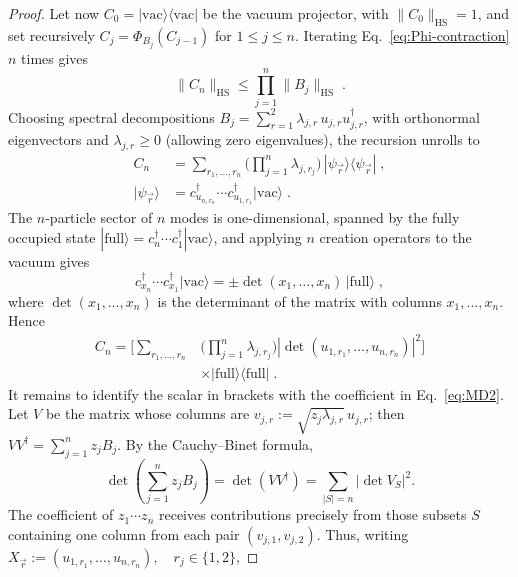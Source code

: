 \documentclass[prx,twocolumn,superscriptaddress,aps,10pt, frontmatterverbose, reprint,footinbib,longbibliography=true]{revtex4-2}
\begin{document}
\begin{proof}
Let now $C_0=|\mathrm{vac}\rangle\langle\mathrm{vac}|$ be the vacuum projector, with $\|C_0\|_{\mathrm{HS}}=1$, and set recursively $C_j=\Phi_{B_j}(C_{j-1})$ for $1\le j\le n$. Iterating Eq.~\eqref{eq:Phi-contraction} $n$ times gives
\begin{equation}
    \|C_n\|_{\mathrm{HS}}\le\prod_{j=1}^n\|B_j\|_{\mathrm{HS}}\;.
    \label{eq:Cn-bound}
\end{equation}
Choosing spectral decompositions $B_j=\sum_{r=1}^2\lambda_{j,r}\,u_{j,r}u_{j,r}^\dagger$, with orthonormal eigenvectors and $\lambda_{j,r}\ge0$ (allowing zero eigenvalues), the recursion unrolls to
\begin{equation}
\begin{split}
    C_n&=\sum_{r_1,\dots,r_n}\Big(\prod_{j=1}^n\lambda_{j,r_j}\Big)\,|\psi_{\vec r}\rangle\langle\psi_{\vec r}|\;,\\
    |\psi_{\vec r}\rangle&=c^\dagger_{u_{n,r_n}}\cdots c^\dagger_{u_{1,r_1}}|\mathrm{vac}\rangle\;.
    \end{split}
\end{equation}
The $n$-particle sector of $n$ modes is one-dimensional, spanned by the fully occupied state $|\mathrm{full}\rangle=c_n^\dagger\cdots c_1^\dagger|\mathrm{vac}\rangle$, and applying $n$ creation operators to the vacuum gives
\begin{equation}
    c^\dagger_{x_n}\cdots c^\dagger_{x_1}|\mathrm{vac}\rangle=\pm\det(x_1,\dots,x_n)\,|\mathrm{full}\rangle\;,
\end{equation}
where $\det(x_1,\dots,x_n)$ is the determinant of the matrix with columns $x_1,\dots,x_n$. Hence
\begin{equation}
\begin{split}C_n=\Big[\sum_{r_1,\dots,r_n}&\Big(\prod_{j=1}^n\lambda_{j,r_j}\Big)\left|\det(u_{1,r_1},\dots,u_{n,r_n})\right|^2\Big]\\
    &\times|\mathrm{full}\rangle\langle\mathrm{full}|\;.
\end{split}
\label{eq:Cn-scalar}
\end{equation}
It remains to identify the scalar in brackets with the coefficient in Eq.~\eqref{eq:MD2}. 
Let $V$ be the matrix whose columns are $v_{j,r}:=\sqrt{z_j\lambda_{j,r}}\,u_{j,r}$;
then $VV^\dagger=\sum_{j=1}^n z_jB_j$. By the Cauchy--Binet formula,
\begin{equation}
    \det\!\left(\sum_{j=1}^n z_jB_j\right)
=\det(VV^\dagger)
=\sum_{|S|=n} |\det V_S|^2 .
\end{equation}
The coefficient of $z_1\cdots z_n$ receives contributions precisely from
those subsets $S$ containing one column from each pair $(v_{j,1},v_{j,2})$. Thus, writing $X_{\vec r}:=(u_{1,r_1},\ldots,u_{n,r_n}),
\quad r_j\in\{1,2\}$,


\end{proof}
\end{document}
